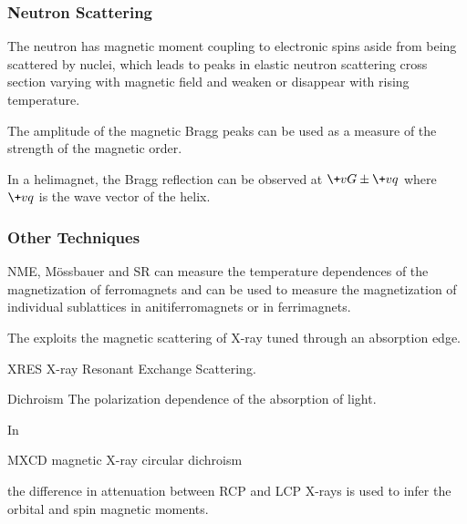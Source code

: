 \documentclass[hidelinks]{article}
\begin{document}

\subsubsection{Neutron Scattering} %
\label{ssub:neutron_scattering}

The neutron has magnetic moment coupling to electronic spins aside from being scattered by nuclei, which leads to peaks in elastic neutron scattering cross section varying with magnetic field and weaken or disappear with rising temperature.
\par
The amplitude of the magnetic Bragg peaks can be used as a measure of the strength of the magnetic order.
\par
In a helimagnet, the Bragg reflection can be observed at $\+vG \pm \+vq$ where $\+vq$ is the wave vector of the helix.


\subsubsection{Other Techniques} %
\label{ssub:other_techniques}

NME, M\"ossbauer and \textmu SR can measure the temperature dependences of the magnetization of ferromagnets and can be used to measure the magnetization of individual sublattices in anitiferromagnets or in ferrimagnets.
\par
The  exploits the magnetic scattering of X-ray tuned through an absorption edge. \begin{margindef}{XRES}
    X-ray Resonant Exchange Scattering.
\end{margindef}
\begin{termdef}[-\baselineskip]{Dichroism}
    The polarization dependence of the absorption of light.
\end{termdef}
In  \begin{margindef}[\baselineskip]{MXCD}
    magnetic X-ray circular dichroism
\end{margindef} the difference in attenuation between RCP and LCP X-rays is used to infer the orbital and spin magnetic moments.


\end{document}
